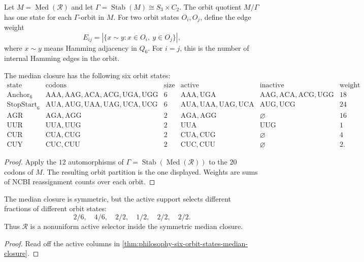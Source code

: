 \begin{definition}
\label{def:philosophy-median-closure-orbit-quotient}
Let $M=\operatorname{Med}(\mathcal{R})$ and let
$\Gamma=\operatorname{Stab}(M)\cong S_{3}\times C_{2}$. The orbit
quotient $M/\Gamma$ has one state for each $\Gamma$-orbit in $M$.
For two orbit states $O_i,O_j$, define the edge weight
$$
  E_{ij}
  =
  |\{x\sim y:x\in O_i,\ y\in O_j\}|,
$$
where $x\sim y$ means Hamming adjacency in $Q_{6}$. For $i=j$, this is
the number of internal Hamming edges in the orbit.
\end{definition}

\begin{theorem}
\label{thm:philosophy-six-orbit-states-median-closure}
The median closure has the following six orbit states:
$$
\begin{array}{c|l|r|l|l|r}
  \text{state} & \text{codons} & \text{size}
  & \text{active} & \text{inactive} & \text{weight}\\
  \hline
  \mathrm{Anchor}_{6}
    & \mathrm{AAA},\mathrm{AAG},\mathrm{ACA},\mathrm{ACG},\mathrm{UGA},\mathrm{UGG}
    & 6 & \mathrm{AAA},\mathrm{UGA}
    & \mathrm{AAG},\mathrm{ACA},\mathrm{ACG},\mathrm{UGG} & 18\\
  \mathrm{StopStart}_{6}
    & \mathrm{AUA},\mathrm{AUG},\mathrm{UAA},\mathrm{UAG},\mathrm{UCA},\mathrm{UCG}
    & 6 & \mathrm{AUA},\mathrm{UAA},\mathrm{UAG},\mathrm{UCA}
    & \mathrm{AUG},\mathrm{UCG} & 24\\
  \mathrm{AGR}
    & \mathrm{AGA},\mathrm{AGG}
    & 2 & \mathrm{AGA},\mathrm{AGG} & \varnothing & 16\\
  \mathrm{UUR}
    & \mathrm{UUA},\mathrm{UUG}
    & 2 & \mathrm{UUA} & \mathrm{UUG} & 1\\
  \mathrm{CUR}
    & \mathrm{CUA},\mathrm{CUG}
    & 2 & \mathrm{CUA},\mathrm{CUG} & \varnothing & 4\\
  \mathrm{CUY}
    & \mathrm{CUC},\mathrm{CUU}
    & 2 & \mathrm{CUC},\mathrm{CUU} & \varnothing & 2.
\end{array}
$$
\end{theorem}
\begin{proof}
Apply the $12$ automorphisms of
$\Gamma=\operatorname{Stab}(\operatorname{Med}(\mathcal{R}))$ to the
$20$ codons of $M$. The resulting orbit partition is the one displayed.
Weights are sums of NCBI reassignment counts over each orbit.
\end{proof}

\begin{corollary}
\label{cor:philosophy-active-support-orbit-selector}
The median closure is symmetric, but the active support selects
different fractions of different orbit states:
$$
  2/6,\quad 4/6,\quad 2/2,\quad 1/2,\quad 2/2,\quad 2/2.
$$
Thus $\mathcal{R}$ is a nonuniform active selector inside the symmetric
median closure.
\end{corollary}
\begin{proof}
Read off the active columns in
\autoref{thm:philosophy-six-orbit-states-median-closure}.
\end{proof}

